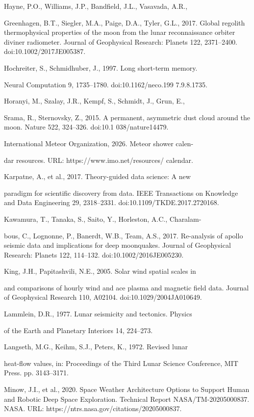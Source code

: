 Hayne, P.O., Williams, J.P., Bandfield, J.L., Vasavada, A.R.,

Greenhagen, B.T., Siegler, M.A., Paige, D.A., Tyler, G.L., 2017. Global regolith thermophysical properties of the moon from the lunar reconnaissance orbiter diviner radiometer. Journal of Geophysical Research: Planets 122, 2371--2400. doi:10.1002/2017JE005387.

Hochreiter, S., Schmidhuber, J., 1997. Long short-term memory.

Neural Computation 9, 1735--1780. doi:10.1162/neco.199 7.9.8.1735.

Horanyi, M., Szalay, J.R., Kempf, S., Schmidt, J., Grun, E.,

Srama, R., Sternovsky, Z., 2015. A permanent, asymmetric dust cloud around the moon. Nature 522, 324--326. doi:10.1 038/nature14479.

International Meteor Organization, 2026. Meteor shower calen-

dar resources. URL: https://www.imo.net/resources/ calendar.

Karpatne, A., et al., 2017. Theory-guided data science: A new

paradigm for scientific discovery from data. IEEE Transactions on Knowledge and Data Engineering 29, 2318--2331. doi:10.1109/TKDE.2017.2720168.

Kawamura, T., Tanaka, S., Saito, Y., Horleston, A.C., Charalam-

bous, C., Lognonne, P., Banerdt, W.B., Team, A.S., 2017. Re-analysis of apollo seismic data and implications for deep moonquakes. Journal of Geophysical Research: Planets 122, 114--132. doi:10.1002/2016JE005230.

King, J.H., Papitashvili, N.E., 2005. Solar wind spatial scales in

and comparisons of hourly wind and ace plasma and magnetic field data. Journal of Geophysical Research 110, A02104. doi:10.1029/2004JA010649.

Lammlein, D.R., 1977. Lunar seismicity and tectonics. Physics

of the Earth and Planetary Interiors 14, 224--273.

Langseth, M.G., Keihm, S.J., Peters, K., 1972. Revised lunar

heat-flow values, in: Proceedings of the Third Lunar Science Conference, MIT Press. pp. 3143--3171.

Minow, J.I., et al., 2020. Space Weather Architecture Options to Support Human and Robotic Deep Space Exploration. Technical Report NASA/TM-20205000837. NASA. URL: https://ntrs.nasa.gov/citations/20205000837.

